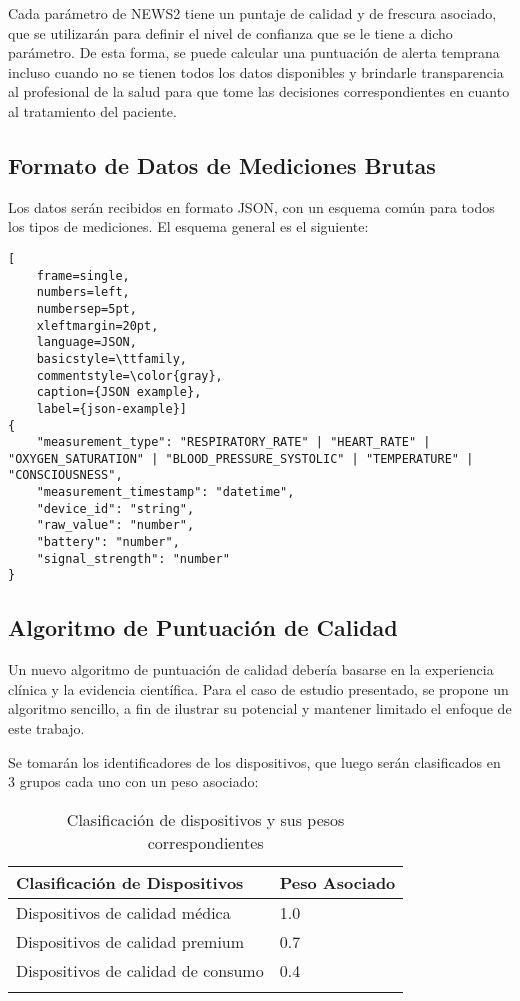 Cada parámetro de NEWS2 tiene un puntaje de calidad y de frescura asociado, que se utilizarán para definir el nivel de confianza que se le tiene a dicho parámetro.
De esta forma, se puede calcular una puntuación de alerta temprana incluso cuando no se tienen todos los datos disponibles 
y brindarle transparencia al profesional de la salud para que tome las decisiones correspondientes en cuanto al tratamiento del paciente.

\subsection{Formato de Datos de Mediciones Brutas}

Los datos serán recibidos en formato JSON, con un esquema común para todos los tipos de mediciones.
El esquema general es el siguiente:
\begin{lstlisting}[
    frame=single,
    numbers=left,
    numbersep=5pt,
    xleftmargin=20pt,
    language=JSON,
    basicstyle=\ttfamily,
    commentstyle=\color{gray},
    caption={JSON example},
    label={json-example}]
{
    "measurement_type": "RESPIRATORY_RATE" | "HEART_RATE" | "OXYGEN_SATURATION" | "BLOOD_PRESSURE_SYSTOLIC" | "TEMPERATURE" | "CONSCIOUSNESS",
    "measurement_timestamp": "datetime",
    "device_id": "string",
    "raw_value": "number",
    "battery": "number",
    "signal_strength": "number"
}
\end{lstlisting}
\newpage

\subsection{Algoritmo de Puntuación de Calidad}
Un nuevo algoritmo de puntuación de calidad debería basarse en la experiencia clínica y la evidencia científica. Para el caso de estudio presentado, 
se propone un algoritmo sencillo, a fin de ilustrar su potencial y mantener limitado el enfoque de este trabajo.\newline

Se tomarán los identificadores de los dispositivos, que luego serán clasificados en 3 grupos cada uno con un peso asociado: 

\begin{longtable}{|p{6cm}|p{3cm}|}
    \hline
    \textbf{Clasificación de Dispositivos} & \textbf{Peso Asociado} \\
    \hline
    \endhead
    Dispositivos de calidad médica & 1.0 \\
    \hline
    Dispositivos de calidad premium & 0.7 \\
    \hline
    Dispositivos de calidad de consumo & 0.4 \\
    \hline
    \caption{Clasificación de dispositivos y sus pesos correspondientes}
    \label{tab:dispositivos}
\end{longtable}

